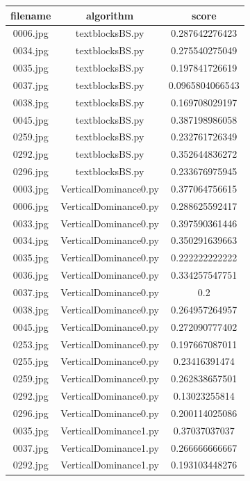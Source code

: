 \documentclass[a4paper,10pt]{article}
\begin{document}
				\begin{table}[htbp]
				\centering
				\begin{tabular}{|c|c|c|}
				\hline
				filename&algorithm&score\\
				\hline
				0006.jpg&textblocksBS.py&0.287642276423\\
0034.jpg&textblocksBS.py&0.275540275049\\
0035.jpg&textblocksBS.py&0.197841726619\\
0037.jpg&textblocksBS.py&0.0965804066543\\
0038.jpg&textblocksBS.py&0.169708029197\\
0045.jpg&textblocksBS.py&0.387198986058\\
0259.jpg&textblocksBS.py&0.232761726349\\
0292.jpg&textblocksBS.py&0.352644836272\\
0296.jpg&textblocksBS.py&0.233676975945\\
0003.jpg&VerticalDominance0.py&0.377064756615\\
0006.jpg&VerticalDominance0.py&0.288625592417\\
0033.jpg&VerticalDominance0.py&0.397590361446\\
0034.jpg&VerticalDominance0.py&0.350291639663\\
0035.jpg&VerticalDominance0.py&0.222222222222\\
0036.jpg&VerticalDominance0.py&0.334257547751\\
0037.jpg&VerticalDominance0.py&0.2\\
0038.jpg&VerticalDominance0.py&0.264957264957\\
0045.jpg&VerticalDominance0.py&0.272090777402\\
0253.jpg&VerticalDominance0.py&0.197667087011\\
0255.jpg&VerticalDominance0.py&0.23416391474\\
0259.jpg&VerticalDominance0.py&0.262838657501\\
0292.jpg&VerticalDominance0.py&0.13023255814\\
0296.jpg&VerticalDominance0.py&0.200114025086\\
0035.jpg&VerticalDominance1.py&0.37037037037\\
0037.jpg&VerticalDominance1.py&0.266666666667\\
0292.jpg&VerticalDominance1.py&0.193103448276\\

				\hline
				\end{tabular}
				\end{table}
				 
\end{document}
